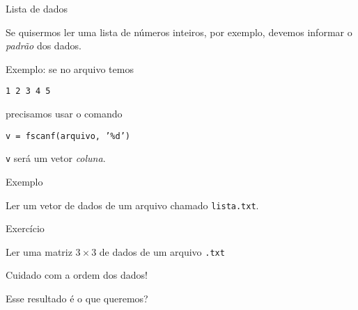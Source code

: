 \documentclass[hyperref={pdfpagelabels=false}]{beamer}
\begin{document}
\begin{frame}{Lista de dados}

  Se quisermos ler uma lista de números inteiros, por exemplo, devemos informar o \emph{padrão} dos dados.

  Exemplo: se no arquivo temos
  \begin{center}
    \texttt{1 2 3 4 5}
  \end{center}

  precisamos usar o comando

  \begin{center}
    \texttt{v = fscanf(arquivo, '\%d')}
  \end{center}

  \texttt{v} será um vetor \emph{coluna}.
  
\end{frame}

\begin{frame}{Exemplo}

  Ler um vetor de dados de um arquivo chamado \texttt{lista.txt}.

  \begin{center}
    \begin{minipage}{0.95\textwidth}
      
    \end{minipage}
  \end{center}
\end{frame}

\begin{frame}{Exercício}

  Ler uma matriz $3\times 3$ de dados de um arquivo \texttt{.txt}

  \begin{center}
    \alert{Cuidado com a ordem dos dados!}
  \end{center}

  \begin{center}
    \begin{minipage}{0.95\linewidth}
      
    \end{minipage}
  \end{center}

  Esse resultado é o que queremos?
  
\end{frame}
\end{document}
